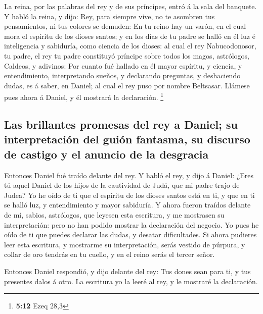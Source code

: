  La reina, por las palabras del rey y de sus príncipes,
entró á la sala del banquete. Y habló la reina, y dijo: Rey, para
siempre vive, no te asombren tus pensamientos, ni tus colores se
demuden:  En tu reino hay un varón, en el cual mora el
espíritu de los dioses santos; y en los días de tu padre se halló en él
luz é inteligencia y sabiduría, como ciencia de los dioses: al cual el
rey Nabucodonosor, tu padre, el rey tu padre constituyó príncipe sobre
todos los magos, astrólogos, Caldeos, y adivinos:  Por
cuanto fué hallado en él mayor espíritu, y ciencia, y entendimiento,
interpretando sueños, y declarando preguntas, y deshaciendo dudas, es á
saber, en Daniel; al cual el rey puso por nombre Beltsasar. Llámese pues
ahora á Daniel, y él mostrará la declaración. \footnote{\textbf{5:12}
  Ezeq 28,3}

\hypertarget{las-brillantes-promesas-del-rey-a-daniel-su-interpretaciuxf3n-del-guiuxf3n-fantasma-su-discurso-de-castigo-y-el-anuncio-de-la-desgracia}{%
\subsection{Las brillantes promesas del rey a Daniel; su interpretación
del guión fantasma, su discurso de castigo y el anuncio de la
desgracia}\label{las-brillantes-promesas-del-rey-a-daniel-su-interpretaciuxf3n-del-guiuxf3n-fantasma-su-discurso-de-castigo-y-el-anuncio-de-la-desgracia}}

 Entonces Daniel fué traído delante del rey. Y habló el
rey, y dijo á Daniel: ¿Eres tú aquel Daniel de los hijos de la
cautividad de Judá, que mi padre trajo de Judea?  Yo he
oído de ti que el espíritu de los dioses santos está en ti, y que en ti
se halló luz, y entendimiento y mayor sabiduría.  Y ahora
fueron traídos delante de mí, sabios, astrólogos, que leyesen esta
escritura, y me mostrasen su interpretación: pero no han podido mostrar
la declaración del negocio.  Yo pues he oído de ti que
puedes declarar las dudas, y desatar dificultades. Si ahora pudieres
leer esta escritura, y mostrarme su interpretación, serás vestido de
púrpura, y collar de oro tendrás en tu cuello, y en el reino serás el
tercer señor.

 Entonces Daniel respondió, y dijo delante del rey: Tus
dones sean para ti, y tus presentes dalos á otro. La escritura yo la
leeré al rey, y le mostraré la declaración.

